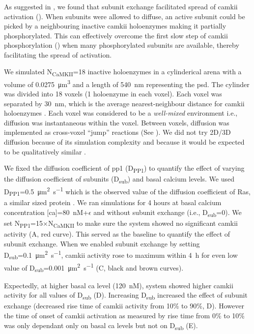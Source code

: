 \documentclass[9pt,lineno,doublespacing]{elife}
\newcommand\SUB[2]{#1\textsubscript{#2}}
\begin{document}
As suggested in \citep{stratton_activation-triggered_2014}, we found that
subunit exchange facilitated spread of \gls{camkii} activation
(). When subunits were allowed to diffuse, an
active subunit could be picked by a neighbouring inactive \gls{camkii}
holoenzymes making it partially phosphorylated. This can effectively overcome
the first slow step of \gls{camkii} phosphorylation () when many
phosphorylated subunits are available, thereby facilitating the spread of
activation.

We simulated \SUB{N}{CaMKII}=18 inactive holoenzymes in a cylinderical arena
with a volume of \SI{0.0275}{\cubic\micro\meter} and a length of
\SI{540}{\nano\meter} representing the \gls{psd}. The cylinder was divided into
18 voxels (1 holoenzyme in each voxel). Each voxel was separated by
\SI{30}{\nano\meter}, which is the average nearest-neighbour distance for
\gls{camkii} holoenzymes \citep{feng_quantitative_2011}. Each voxel was
considered to be a \emph{well-mixed} environment i.e., diffusion was
instantaneous within the voxel. Between voxels, diffusion was implemented as
cross-voxel ``jump'' reactions (See ). We did
not try 2D/3D diffusion because of its simulation complexity and because it
would be expected to be qualitatively similar \citep{fange_stochastic_2010}.

We fixed the diffusion coefficient of \gls{pp1} (\SUB{D}{PP1}) to quantify the
effect of varying the diffusion coefficient of subunits (\SUB{D}{sub}) and basal
calcium levels. We used \SUB{D}{PP1}=\SI{0.5}{\micro\meter\squared\per\second}
which is the observed value of the diffusion coefficient of Ras, a similar sized
protein \citep{harvey_spread_2008}. We ran simulations for 4 hours at basal
calcium concentration [\gls{ca}]=\SI{80}{\nano M}+$\epsilon$ and without subunit
exchange (i.e., \SUB{D}{sub}=0). We set \SUB{N}{PP1}=15$\times$\SUB{N}{CaMKII}
to make sure the system showed no significant \gls{camkii} activity
(A, red curve). This served as the baseline to
quantify the effect of subunit exchange. When we enabled subunit exchange by
setting \SUB{D}{sub}=\SI{0.1}{\micro\meter\squared\per\second}, \gls{camkii}
activity rose to maximum within \SI{4}{\hour} for even low value of
\SUB{D}{sub}=\SI{0.001}{\micro\meter\squared\per\second}
(C, black and brown curves).

Expectedly, at higher basal \gls{ca} level (\SI{120}{\nano M}), system showed
higher \gls{camkii} activity for all values of \SUB{D}{sub}
(D). Increasing \SUB{D}{sub} increased the
effect of subunit exchange (decreased rise time of \gls{camkii} activity from
10\% to 90\%, D). However the time of onset of
\gls{camkii} activation as measured by rise time from 0\% to 10\% was only
dependant only on basal \gls{ca} levels but not on \SUB{D}{sub}
(E).
\end{document}
